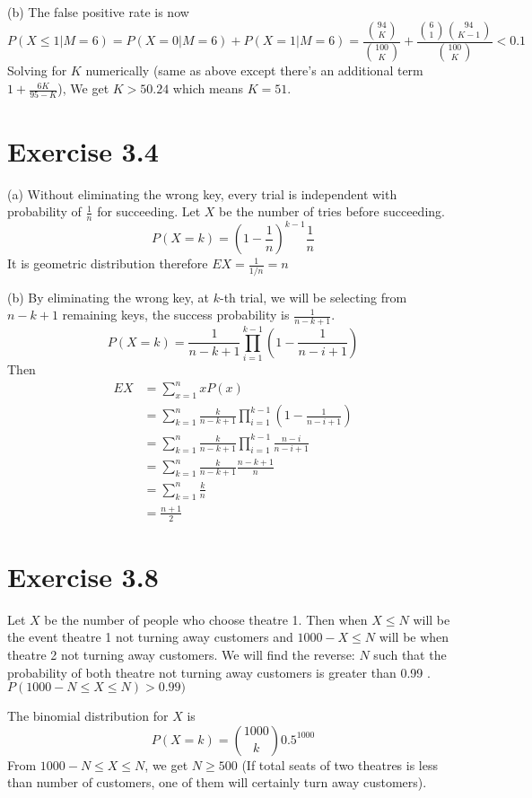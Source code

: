\documentclass[12pt]{article}
\begin{document}
(b)
The false positive rate is now 
$$P(X\leq 1 | M = 6) = P(X=0|M=6) + P(X=1|M=6)=  \frac{{94 \choose K}}{{100 \choose K}} +  \frac{{6 \choose 1}{94 \choose K-1}}{{100 \choose K}} < 0.1 $$
Solving for $K$ numerically (same as above except there's an additional term $1 + \frac{6K}{95-K}$), We get $K > 50.24$ which means $K=51$.

\section*{Exercise 3.4}
(a) Without eliminating the wrong key, every trial is independent with probability of $\frac{1}{n}$ for succeeding. Let $X$ be the number of tries before succeeding. 
$$P(X=k) = \left(1 - \frac{1}{n}\right)^{k-1} \frac{1}{n}$$
It is geometric distribution therefore $EX = \frac{1}{1/n} = n$

(b) By eliminating the wrong key, at $k$-th trial, we will be selecting from $n - k + 1$ remaining keys, the success probability is $\frac{1}{n-k+1}$. 
$$P(X=k) = \frac{1}{n-k+1} \prod^{k-1}_{i=1} \left(1- \frac{1}{n-i+1} \right)$$
Then
$$\begin{aligned}
EX &= \sum_{x=1}^{n} xP(x) \\
   &= \sum_{k=1}^{n} \frac{k}{n-k+1} \prod^{k-1}_{i=1} \left(1- \frac{1}{n-i+1} \right) \\
   &= \sum_{k=1}^{n} \frac{k}{n-k+1} \prod^{k-1}_{i=1} \frac{n -i}{n-i+1} \\
   &= \sum_{k=1}^{n} \frac{k}{n-k+1} \frac{n - k + 1}{n} \\
   &= \sum_{k=1}^{n} \frac{k}{n} \\
   &= \frac{n+1}{2}
\end{aligned}$$

\section*{Exercise 3.8}
Let $X$ be the number of people who choose theatre 1. Then when $X \leq N$ will be the event theatre 1 not turning away customers and $1000 - X \leq N$ will be when theatre 2 not turning away customers.
We will find the reverse: $N$ such that the probability of both theatre not turning away customers is greater than 0.99 .  $P(1000 -N \leq X \leq N) > 0.99)$

The binomial distribution for $X$ is $$ P(X = k) = {1000 \choose k} 0.5^{1000}$$
From $1000 -N \leq X \leq N$, we get $N \geq 500$ (If total seats of two theatres is less than number of customers, one of them will certainly turn away customers).
\end{document}
